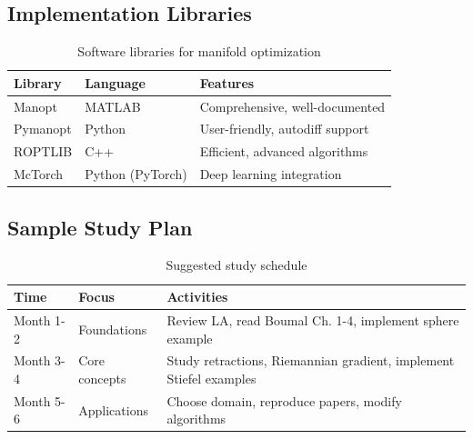 \documentclass[11pt]{article}
\begin{document}
\subsection{Implementation Libraries}
\begin{table}[h]
    \centering
    \begin{tabular}{p{} p{} p{}}
        \toprule
        \textbf{Library} & \textbf{Language} & \textbf{Features} \\
        \midrule
        Manopt & MATLAB & Comprehensive, well-documented \\
        \addlinespace
        Pymanopt & Python & User-friendly, autodiff support \\
        \addlinespace
        ROPTLIB & C++ & Efficient, advanced algorithms \\
        \addlinespace
        McTorch & Python (PyTorch) & Deep learning integration \\
        \bottomrule
    \end{tabular}
    \caption{Software libraries for manifold optimization}
\end{table}

\subsection{Sample Study Plan}
\begin{table}[h]
    \centering
    \begin{tabular}{p{} p{} p{}}
        \toprule
        \textbf{Time} & \textbf{Focus} & \textbf{Activities} \\
        \midrule
        Month 1-2 & Foundations & Review LA, read Boumal Ch. 1-4, implement sphere example \\
        \addlinespace
        Month 3-4 & Core concepts & Study retractions, Riemannian gradient, implement Stiefel examples \\
        \addlinespace
        Month 5-6 & Applications & Choose domain, reproduce papers, modify algorithms \\
        \bottomrule
    \end{tabular}
    \caption{Suggested study schedule}
\end{table}
\end{document}
